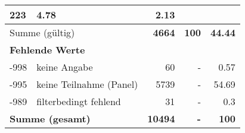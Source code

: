 \begin{longtable}{lXrrr}
       \num{223} &
       \num[round-mode=places,round-precision=2]{4,78} &
         \num[round-mode=places,round-precision=2]{2,13} \\
     \midrule
     \multicolumn{2}{l}{Summe (gültig)} &
       \textbf{\num{4664}} &
     \textbf{100} &
       \textbf{\num[round-mode=places,round-precision=2]{44,44}} \\
     \multicolumn{5}{l}{\textbf{Fehlende Werte}}\\
       -998 &
       keine Angabe &
         \num{60} &
        - &
         \num[round-mode=places,round-precision=2]{0,57} \\
       -995 &
       keine Teilnahme (Panel) &
         \num{5739} &
        - &
         \num[round-mode=places,round-precision=2]{54,69} \\
       -989 &
       filterbedingt fehlend &
         \num{31} &
        - &
         \num[round-mode=places,round-precision=2]{0,3} \\
     \midrule
     \multicolumn{2}{l}{\textbf{Summe (gesamt)}} &
          \textbf{\num{10494}} &
        \textbf{-} &
        \textbf{100} \\
     \bottomrule
     \end{longtable}
     
